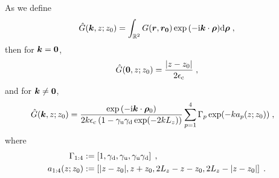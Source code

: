 \begin{thm}\label{Proposition...GreensFunction}
    As we define
    \begin{equation}
        \Hat{G}(\bm{k}, z; z_0) = \int_{\mathbb{R}^2} G(\boldsymbol{r}, \boldsymbol{r_0}) \exp{(-\mathrm{i} \boldsymbol{k} \cdot \boldsymbol{\rho})} \mathrm{d} \bm{\rho}\;,
    \end{equation}
then for $\bm{k}=\bm{0}$,
\begin{equation}\label{eq...hat_G_solution...Zeroth}
        \hat{G}(\bm{0}, z; z_0) = \frac{\lvert z-z_0\rvert}{2 \epsilon_{\mathrm{c}}}\;,
\end{equation}
and for $\bm{k}\neq \bm{0}$,
    \begin{equation}\label{eq...hat_G_solution...Non-zero}
    \begin{aligned}
\hat{G}(\vk, z; z_0) &=  \frac{ \exp{(-\mathrm{i} \V{k} \cdot \V{\rho}_0)}}{2k\epsilon_{\mrm{c}}\left(1-\gamma_{\mrm{u}}\gamma_{\mrm{d}}\exp(-2kL_z)\right)} \sum_{p=1}^4\Gamma_p\exp(-ka_p(z;z_0))\;, %
    \end{aligned}     
    \end{equation}
where 
\begin{align*}
 \Gamma_{1:4}&:=\left[1,\gamma_{\mathrm{d}},\gamma_{\mathrm{u}},\gamma_{\mathrm{u}}\gamma_{\mathrm{d}}\right]\;,\\
 a_{1:4}(z;z_0)&:=\left[\lvert z-z_0\rvert, z+z_0,2L_z-z-z_0,2L_z-\lvert z-z_0\rvert\right]\;.
\end{align*}
\end{thm}
